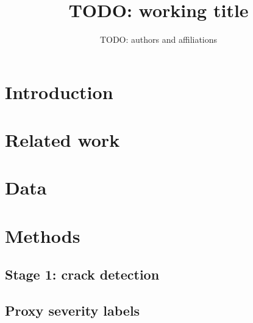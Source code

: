 \documentclass[11pt,a4paper]{article}
\title{TODO: working title}
\author{TODO: authors and affiliations}
\date{}
\begin{document}
\maketitle

\begin{abstract}
\end{abstract}

\section{Introduction}

\section{Related work}

\section{Data}

\section{Methods}
\subsection{Stage 1: crack detection}

\subsection{Proxy severity labels}
\end{document}
